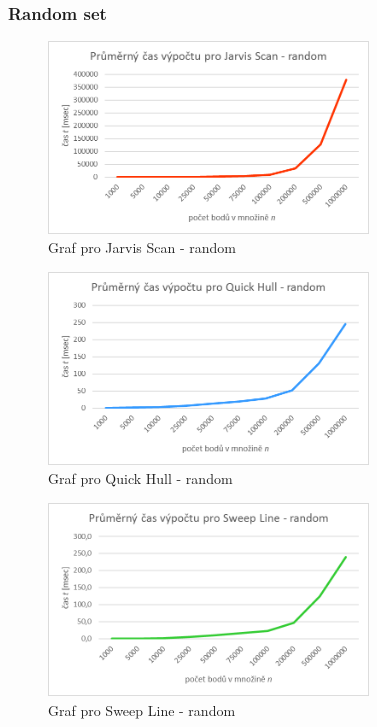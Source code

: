 \documentclass[a4paper, 12pt]{article}
\begin{document}
\subsubsection{Random set}
\begin{figure}[h!]
	\centering
	\includegraphics[width=8.5cm]{./pictures/g_rand_js.png}
	\caption{Graf pro Jarvis Scan - random}
\end{figure}

\begin{figure}[h!]
	\centering
	\includegraphics[width=8.5cm]{./pictures/g_rand_qh.png}
	\caption{Graf pro Quick Hull - random}
\end{figure}

\begin{figure}[h!]
	\centering
	\includegraphics[width=8.5cm]{./pictures/g_rand_sl.png}
	\caption{Graf pro Sweep Line - random}
\end{figure}
\clearpage
\end{document}
